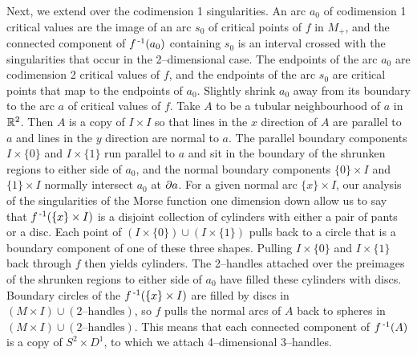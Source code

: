 Next, we extend over the codimension 1 singularities.
An arc $a_0$ of codimension 1 critical values are the image of an arc $s_0$ of critical points of $f$ in $M_+$, and the connected component of $f^{\,\text{-}1} (a_0)$ containing $s_0$ is an interval crossed with the singularities that occur in the 2--dimensional case.
The endpoints of the arc $a_0$ are codimension 2 critical values of $f$, and the endpoints of the arc $s_0$ are critical points that map to the endpoints of $a_0$.
Slightly shrink $a_0$ away from its boundary to the arc $a$ of critical values of $f$.
Take $A$ to be a tubular neighbourhood of $a$ in $\mathbb{R}^2$.
Then $A$ is a copy of $I\times I$ so that lines in the $x$ direction of $A$ are parallel to $a$ and lines in the $y$ direction are normal to $a$.
The parallel boundary components $I\times \{0\}$ and $I\times \{1\}$ run parallel to $a$ and sit in the boundary of the shrunken regions to either side of $a_0$, and the normal boundary components $\{0\}\times I$ and $\{1\}\times I$ normally intersect $a_0$ at $\partial a$.
For a given normal arc $\{x\}\times I$, our analysis of the singularities of the Morse function one dimension down allow us to say that $f^{\,\text{-}1}(\{x\}\times I)$ is a disjoint collection of cylinders with either a pair of pants or a disc.
Each point of $(I\times \{0\})\cup (I\times\{1\})$ pulls back to a circle that is a boundary component of one of these three shapes.
Pulling $I\times \{0\}$ and $I\times\{1\}$ back through $f$ then yields cylinders.
The 2--handles attached over the preimages of the shrunken regions to either side of $a_0$ have filled these cylinders with discs.
Boundary circles of the $f^{\,\text{-}1} (\{x\}\times I)$ are filled by discs in $(M\times I)\cup (2\text{--handles})$, so $f$ pulls the normal arcs of $A$ back to spheres in $(M\times I)\cup (2\text{--handles})$.
This means that each connected component of $f^{\,\text{-}1} (A)$ is a copy of $S^2\times D^1$, to which we attach 4--dimensional 3--handles.

